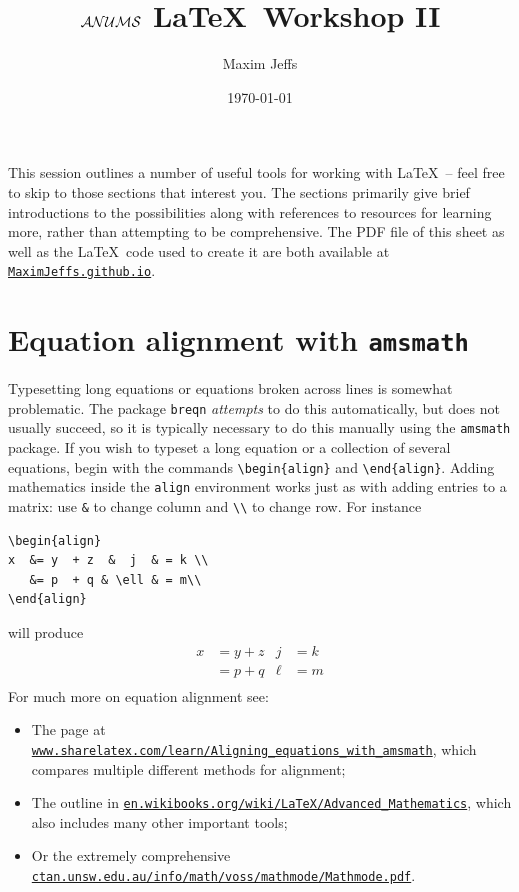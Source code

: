 \documentclass[11pt]{article}
\title{\textbf{$\mathcal{ANUMS}$ \LaTeX\ Workshop II}}
\author{Maxim Jeffs}
\date{\today}
\newcommand{\eqn}[1]{\begin{align*} #1 \end{align*}}
\begin{document}
\maketitle

This session outlines a number of useful tools for working with \LaTeX\ -- feel free to skip to those sections that interest you. The sections primarily give brief introductions to the possibilities along with references to resources for learning more, rather than attempting to be comprehensive. The PDF file of this sheet as well as the \LaTeX\ code used to create it are both available at \href{https://maximjeffs.github.io/}{\texttt{MaximJeffs.github.io}}.


\section{Equation alignment with \texttt{amsmath}}

Typesetting long equations or equations broken across lines is somewhat problematic. The package \texttt{breqn} \textit{attempts} to do this automatically, but does not usually succeed, so it is typically necessary to do this manually using the \verb$amsmath$ package. If you wish to typeset a long equation or a collection of several equations, begin with the commands \verb$\begin{align}$ and \verb$\end{align}$. Adding mathematics inside the \texttt{align} environment works just as with adding entries to a matrix: use \verb$&$ to change column and \verb$\\$ to change row. For instance
\begin{verbatim}
\begin{align}
x  &= y  + z  &  j  & = k \\
   &= p  + q & \ell & = m\\
\end{align}
\end{verbatim}
will produce
\eqn{
x  &= y  + z  &  j  & = k \\
    & = p  + q  & \ell & = m\\
}
For much more on equation alignment see: 
\begin{itemize}
\item The page at \href{https://www.sharelatex.com/learn/Aligning_equations_with_amsmath}{\texttt{www.sharelatex.com/learn/Aligning\_equations\_with\_amsmath}}, which compares multiple different methods for alignment;
\item The outline in  \href{https://en.wikibooks.org/wiki/LaTeX/Advanced_Mathematics}{\texttt{en.wikibooks.org/wiki/LaTeX/Advanced\_Mathematics}}, which also includes many other important tools;
\item Or the extremely comprehensive \href{http://ctan.unsw.edu.au/info/math/voss/mathmode/Mathmode.pdf}{\texttt{ctan.unsw.edu.au/info/math/voss/mathmode/Mathmode.pdf}}. 
\end{itemize} 
\end{document}
